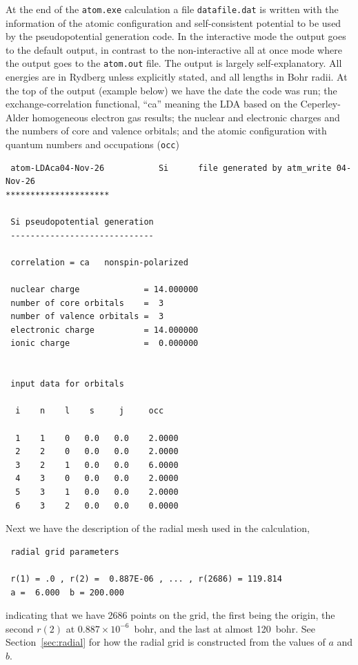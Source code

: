 \documentclass[11pt]{article}
\begin{document}
At the end of the \texttt{atom.exe} calculation a file \texttt{datafile.dat} is written with the information of the
atomic configuration and self-consistent potential to be used by the pseudopotential generation code.
In the interactive mode the output goes to the default output, in contrast to the non-interactive
all at once mode where the output goes to the \texttt{atom.out} file.
The output is largely self-explanatory.  All energies are in Rydberg
unless explicitly stated, and all lengths in Bohr radii.
At the top of the output (example below) we have the date the code was run;
the exchange-correlation functional, ``ca'' meaning the LDA based on the Ceperley-Alder
homogeneous electron gas results; the nuclear and electronic charges and the numbers of
core and valence orbitals; and the atomic configuration with quantum numbers and occupations (\texttt{occ})
\begin{verbatim}
 atom-LDAca04-Nov-26           Si      file generated by atm_write 04-Nov-26
*********************

 Si pseudopotential generation
 -----------------------------

 correlation = ca   nonspin-polarized

 nuclear charge             = 14.000000
 number of core orbitals    =  3
 number of valence orbitals =  3
 electronic charge          = 14.000000
 ionic charge               =  0.000000


 input data for orbitals

  i    n    l    s     j     occ

  1    1    0   0.0   0.0    2.0000
  2    2    0   0.0   0.0    2.0000
  3    2    1   0.0   0.0    6.0000
  4    3    0   0.0   0.0    2.0000
  5    3    1   0.0   0.0    2.0000
  6    3    2   0.0   0.0    0.0000
\end{verbatim}
Next we have the description of the radial mesh used in the calculation,
\begin{verbatim}
 radial grid parameters

 r(1) = .0 , r(2) =  0.887E-06 , ... , r(2686) = 119.814
 a =  6.000  b = 200.000
\end{verbatim}
indicating that we have 2686 points on the grid, the first being the origin, 
the second $r(2)$ at $0.887\times 10^{-6}$~bohr, and the last at almost 120~bohr.
See Section~\ref{sec:radial} for how the radial grid is constructed from
the values of $a$ and $b$.
\end{document}
